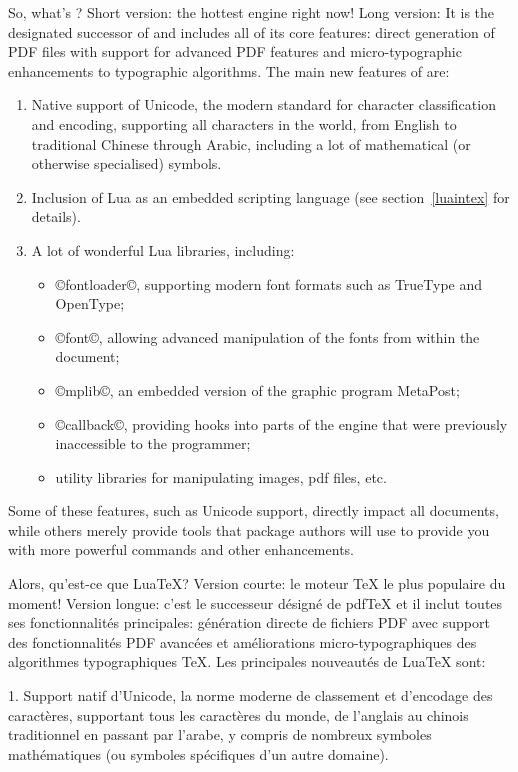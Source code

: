 \documentclass{lltxdoc}
\begin{document}
So, what's \luatex? Short version: the hottest \tex engine right now!
Long version: It is the designated successor of \pdftex and
includes all of its core features: direct generation of PDF files with support
for advanced PDF features and micro-typographic enhancements to \tex
typographic algorithms. The main new features of \luatex are:
\begin{enumerate}
  \item Native support of Unicode, the modern standard for character
    classification and encoding, supporting all characters in the world, from
    English to traditional Chinese through Arabic, including a lot of
    mathematical (or otherwise specialised) symbols.
  \item Inclusion of Lua as an embedded scripting language (see
    section~\ref{luaintex} for details).
  \item A lot of wonderful Lua libraries, including:
    \begin{itemize}
      \item ©fontloader©, supporting modern font formats such as
        TrueType and OpenType;
      \item ©font©, allowing advanced manipulation of the fonts
        from within the document;
      \item ©mplib©, an embedded version of the graphic program MetaPost;
      \item ©callback©, providing hooks into parts of the \tex engine that
        were previously inaccessible to the programmer;
      \item utility libraries for manipulating images, pdf files, etc.
    \end{itemize}
\end{enumerate}
Some of these features, such as Unicode support, directly impact all
documents, while others merely provide tools that package authors will use to
provide you with more powerful commands and other enhancements.

Alors, qu'est-ce que LuaTeX? Version courte: le moteur TeX le plus populaire du moment! Version longue: c'est le successeur désigné de pdfTeX et il inclut toutes ses fonctionnalités principales: génération directe de fichiers PDF avec support des fonctionnalités PDF avancées et améliorations micro-typographiques des algorithmes typographiques TeX. Les principales nouveautés de LuaTeX sont:

1. Support natif d'Unicode, la norme moderne de classement et d'encodage des caractères, supportant tous les caractères du monde, de l'anglais au chinois traditionnel en passant par l'arabe, y compris de nombreux symboles mathématiques (ou symboles spécifiques d'un autre domaine).
\end{document}

